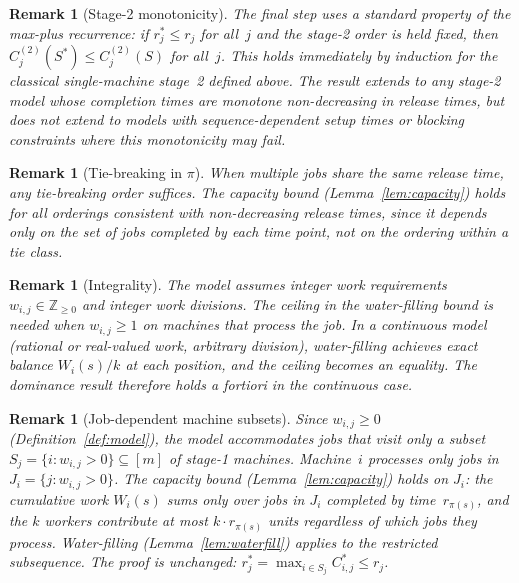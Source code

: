 \documentclass[11pt,titlepage]{article}
\newtheorem{remark}[theorem]{Remark}
\begin{document}
\begin{remark}[Stage-2 monotonicity]
\label{rem:stage2}
The final step uses a standard property of the max-plus
recurrence: if $r^*_j \leq r_j$ for all~$j$ and the stage-2
order is held fixed, then $C^{(2)}_j(S^*) \leq C^{(2)}_j(S)$
for all~$j$. This holds immediately by induction for the
classical single-machine stage~2 defined above. The result
extends to any stage-2 model whose completion times are
monotone non-decreasing in release times, but does not extend
to models with sequence-dependent setup times or blocking
constraints where this monotonicity may fail.
\end{remark}

\begin{remark}[Tie-breaking in $\pi$]
\label{rem:ties}
When multiple jobs share the same release time, any
tie-breaking order suffices. The capacity bound
(Lemma~\ref{lem:capacity}) holds for all orderings
consistent with non-decreasing release times, since it
depends only on the set of jobs completed by each time
point, not on the ordering within a tie class.
\end{remark}

\begin{remark}[Integrality]
\label{rem:integrality}
The model assumes integer work requirements
$w_{i,j} \in \mathbb{Z}_{\geq 0}$ and integer work
divisions. The ceiling in the water-filling bound is needed
when $w_{i,j} \geq 1$ on machines that process the job. In a continuous model (rational
or real-valued work, arbitrary division), water-filling
achieves exact balance $W_i(s)/k$ at each position, and
the ceiling becomes an equality. The dominance result
therefore holds \emph{a fortiori} in the continuous case.
\end{remark}

\begin{remark}[Job-dependent machine subsets]
\label{rem:subsets}
Since $w_{i,j} \geq 0$ (Definition~\ref{def:model}), the
model accommodates jobs that visit only a subset
$S_j = \{i : w_{i,j} > 0\} \subseteq [m]$ of stage-1
machines. Machine~$i$ processes only jobs in
$J_i = \{j : w_{i,j} > 0\}$. The capacity bound
(Lemma~\ref{lem:capacity}) holds on $J_i$: the cumulative
work $W_i(s)$ sums only over jobs in $J_i$ completed by
time~$r_{\pi(s)}$, and the $k$ workers contribute at most
$k \cdot r_{\pi(s)}$ units regardless of which jobs they
process. Water-filling (Lemma~\ref{lem:waterfill}) applies
to the restricted subsequence. The proof is unchanged:
$r^*_j = \max_{i \in S_j} C^*_{i,j} \leq r_j$.
\end{remark}
\end{document}
